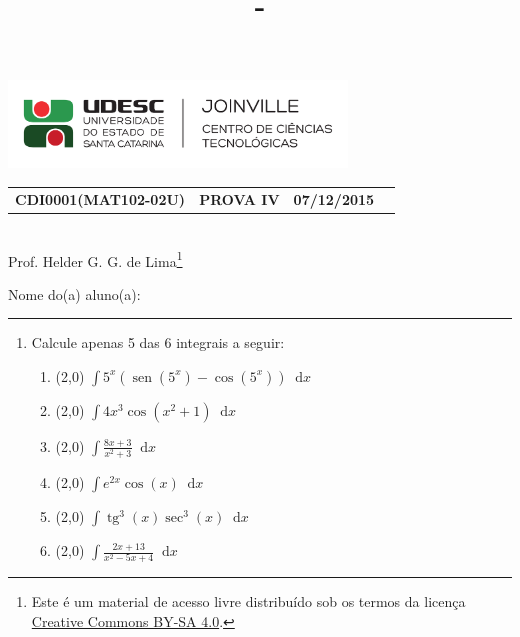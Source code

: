 \documentclass[12pt,a4paper]{article}
\author{\eu}
\title{\tipo - \disciplina}
\date{\data}
\newcommand*\diff{\mathop{}\!\mathrm{d}}
\newcommand*\sen{\operatorname{sen}}
\newcommand*\tg{\operatorname{tg}}
\newcommand*\tipo{PROVA IV}
\newcommand*\turma{MAT102-02U}
\newcommand*\disciplina{CDI0001}
\newcommand*\eu{Helder G. G. de Lima}
\newcommand*\data{07/12/2015}
\begin{document}
\thispagestyle{empty}
\begin{center}
\includegraphics[width=9.0cm]{marca}
\noindent\begin{tabular}{l c c r}
  \textbf{\disciplina (\turma)}
& \textbf{\tipo}
& \textbf{\data}
\end{tabular}
\\ Prof. \eu\footnote{
Este é um material de acesso livre distribuído sob os termos da licença \href{https://creativecommons.org/licenses/by-sa/4.0/deed.pt_BR}{Creative Commons BY-SA 4.0}.}
\end{center}

\noindent Nome do(a) aluno(a): \rule{13cm}{0.01cm}

\begin{center}
\end{center}



\begin{enumerate}
\item Calcule apenas 5 das 6 integrais a seguir:
\begin{enumerate}
\item (2,0) $\displaystyle \int 5^x(\sen(5^x)-\cos(5^x)) \diff x$
\item (2,0) $\displaystyle \int 4x^3 \cos(x^2+1) \diff x$
\item (2,0) $\displaystyle \int \frac{8x+3}{x^2+3} \diff x$
\item (2,0) $\displaystyle \int e^{2x} \cos(x) \diff x$
\item (2,0) $\displaystyle \int \tg^3(x)\sec^3(x) \diff x$
\item (2,0) $\displaystyle \int \frac{2 x+13}{x^2-5 x+4} \diff x$
\end{enumerate}
\end{enumerate}
\end{document}
